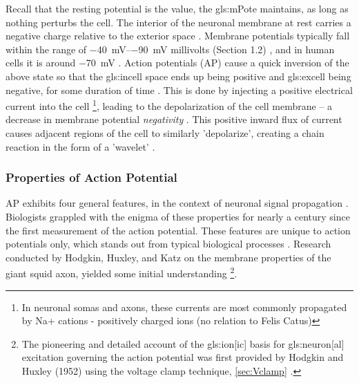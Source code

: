 \documentclass[class={myRUCProject}, crop=false]{standalone}
\begin{document}
Recall that the resting potential is the value, the \gls{gls:mPote} maintains, as long as nothing perturbs the cell. The interior of the neuronal membrane at rest carries a negative charge relative to the exterior space \cite{wood1996neuroscience}. Membrane potentials typically fall within the range of \qtyrange{-40}{-90} {\mV} millivolts (Section 1.2) \cite{ramachandran2002encyclopedia}, and in human cells it is around {\qty{-70}{\milli\volt}} \cite{ Hammond2015ch4}. Action potentials (AP) cause a quick inversion of the above state so that the \gls{gls:incell} space ends up being positive and \gls{gls:excell} being negative, for some duration of time \cite{wood1996neuroscience}. This is done by injecting a positive electrical current into the cell \footnote{In neuronal somas and axons, these currents are most commonly propagated by Na+ cations - positively charged ions (no relation to Felis Catus)}, leading to the depolarization of the cell membrane – a decrease in membrane potential \textit{negativity} \cite{ramachandran2002encyclopedia}. This positive inward flux of current causes adjacent regions of the cell to similarly 'depolarize', creating a chain reaction in the form of a 'wavelet' \cite{hammond2015voltage}. 

\subsubsection{Properties of Action Potential}
AP exhibits four general features, in the context of neuronal signal propagation \cite{kandel2000principles}. Biologists grappled with the enigma of these properties for nearly a century since the first measurement of the action potential. These features are unique to action potentials only, which stands out from typical biological processes \cite{kandel2000principles}. Research conducted by Hodgkin, Huxley, and Katz on the membrane properties of the giant squid axon, yielded some initial understanding \footnote{The pioneering and detailed account of the \gls{gls:ion}[ic] basis for \gls{gls:neuron}[al] excitation governing the action potential
 was first provided by Hodgkin and Huxley (1952) using the voltage clamp technique,  \cref{sec:Vclamp} \cite{HodHux1952,kandel2000principles}.}.
\end{document}
